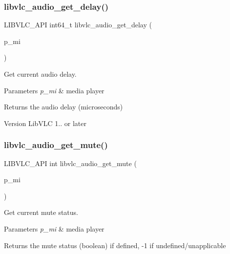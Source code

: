 \subsubsection{\texorpdfstring{libvlc\+\_\+audio\+\_\+get\+\_\+delay()}{libvlc\_audio\_get\_delay()}}
{\footnotesize\ttfamily L\+I\+B\+V\+L\+C\+\_\+\+A\+PI int64\+\_\+t libvlc\+\_\+audio\+\_\+get\+\_\+delay (\begin{DoxyParamCaption}\item[{libvlc\+\_\+media\+\_\+player\+\_\+t $\ast$}]{p\+\_\+mi }\end{DoxyParamCaption})}

Get current audio delay.


\begin{DoxyParams}{Parameters}
{\em p\+\_\+mi} & media player \\
\hline
\end{DoxyParams}
\begin{DoxyReturn}{Returns}
the audio delay (microseconds) 
\end{DoxyReturn}
\begin{DoxyVersion}{Version}
Lib\+V\+LC 1.. or later 
\end{DoxyVersion}
\mbox{\label{group__libvlc__audio_ga665d35d090ddd16d971438755ccadb63}} 
\subsubsection{\texorpdfstring{libvlc\+\_\+audio\+\_\+get\+\_\+mute()}{libvlc\_audio\_get\_mute()}}
{\footnotesize\ttfamily L\+I\+B\+V\+L\+C\+\_\+\+A\+PI int libvlc\+\_\+audio\+\_\+get\+\_\+mute (\begin{DoxyParamCaption}\item[{libvlc\+\_\+media\+\_\+player\+\_\+t $\ast$}]{p\+\_\+mi }\end{DoxyParamCaption})}

Get current mute status.


\begin{DoxyParams}{Parameters}
{\em p\+\_\+mi} & media player \\
\hline
\end{DoxyParams}
\begin{DoxyReturn}{Returns}
the mute status (boolean) if defined, -\/1 if undefined/unapplicable 
\end{DoxyReturn}
\mbox{\label{group__libvlc__audio_gadabd5adec2b51568225004c3e58fbc2d}} 
